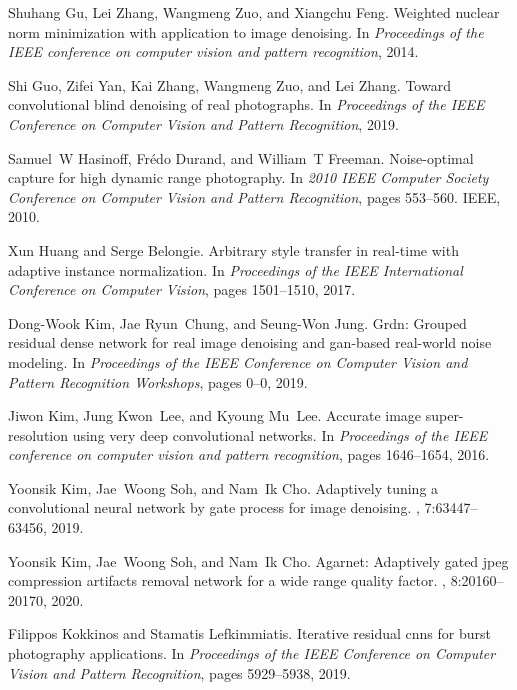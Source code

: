\documentclass[10pt,twocolumn,letterpaper]{article}
\begin{document}
{\begin{thebibliography}{10}
	Shuhang Gu, Lei Zhang, Wangmeng Zuo, and Xiangchu Feng.
	\newblock Weighted nuclear norm minimization with application to image
	denoising.
	\newblock In {\em Proceedings of the IEEE conference on computer vision and
		pattern recognition}, 2014.
	
	Shi Guo, Zifei Yan, Kai Zhang, Wangmeng Zuo, and Lei Zhang.
	\newblock Toward convolutional blind denoising of real photographs.
	\newblock In {\em Proceedings of the IEEE Conference on Computer Vision and
		Pattern Recognition}, 2019.
	
	Samuel~W Hasinoff, Fr{\'e}do Durand, and William~T Freeman.
	\newblock Noise-optimal capture for high dynamic range photography.
	\newblock In {\em 2010 IEEE Computer Society Conference on Computer Vision and
		Pattern Recognition}, pages 553--560. IEEE, 2010.
	
	Xun Huang and Serge Belongie.
	\newblock Arbitrary style transfer in real-time with adaptive instance
	normalization.
	\newblock In {\em Proceedings of the IEEE International Conference on Computer
		Vision}, pages 1501--1510, 2017.
	
	Dong-Wook Kim, Jae Ryun~Chung, and Seung-Won Jung.
	\newblock Grdn: Grouped residual dense network for real image denoising and
	gan-based real-world noise modeling.
	\newblock In {\em Proceedings of the IEEE Conference on Computer Vision and
		Pattern Recognition Workshops}, pages 0--0, 2019.
	
	Jiwon Kim, Jung Kwon~Lee, and Kyoung Mu~Lee.
	\newblock Accurate image super-resolution using very deep convolutional
	networks.
	\newblock In {\em Proceedings of the IEEE conference on computer vision and
		pattern recognition}, pages 1646--1654, 2016.
	
	Yoonsik Kim, Jae~Woong Soh, and Nam~Ik Cho.
	\newblock Adaptively tuning a convolutional neural network by gate process for
	image denoising.
	, 7:63447--63456, 2019.
	
	Yoonsik Kim, Jae~Woong Soh, and Nam~Ik Cho.
	\newblock Agarnet: Adaptively gated jpeg compression artifacts removal network
	for a wide range quality factor.
	, 8:20160--20170, 2020.
	
	Filippos Kokkinos and Stamatis Lefkimmiatis.
	\newblock Iterative residual cnns for burst photography applications.
	\newblock In {\em Proceedings of the IEEE Conference on Computer Vision and
		Pattern Recognition}, pages 5929--5938, 2019.
	

\end{thebibliography}}
\end{document}
